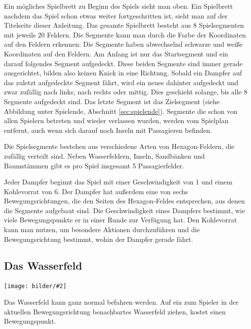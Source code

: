 \documentclass[12pt,a4paper, ngerman, oneside]{scrartcl}
\def\Tiles/{8}
\def\FieldsPerTile/{20}
\def\Passagiere/{5}
\newcommand{\fieldGraphic}[2]{%
\begin{floatingfigure}[#1]{0.15\textwidth}%
  \centering
  \texttt{[image: bilder/\#2]}%
\end{floatingfigure}%
}
\begin{document}
Ein mögliches Spielbrett zu Beginn des Spiels sieht man oben. Ein Spielbrett
nachdem das Spiel schon etwas weiter fortgeschritten ist, sieht man auf der
Titelseite dieser Anleitung. Das gesamte Spielbrett besteht aus \Tiles/
Spielsegmenten mit jeweils \FieldsPerTile/ Feldern. Die Segmente kann man durch
die Farbe der Koordinaten auf den Feldern erkennen: Die Segmente haben
abwechselnd schwarze und weiße Koordinaten auf den Feldern. Am Anfang ist nur
das Startsegment und ein darauf folgendes Segment aufgedeckt. Diese beiden
Segmente sind immer gerade ausgerichtet, bilden also keinen Knick in eine
Richtung. Sobald ein Dampfer auf das zuletzt aufgedeckte Segment fährt, wird ein
neues dahinter aufgedeckt und zwar zufällig nach links, nach rechts oder mittig.
Dies geschieht solange, bis alle \Tiles/ Segmente aufgedeckt sind. Das letzte
Segment ist das Zielsegment (siehe Abbildung unter Spielende, Abschnitt
\ref{sec:spielende}). Segmente die schon von allen Spielern betreten und wieder
verlassen wurden, werden vom Spielplan entfernt, auch wenn sich darauf noch
Inseln mit Passagieren befinden.

Die Spielsegmente bestehen aus verschiedene Arten von Hexagon-Feldern, die
zufällig verteilt sind. Neben Wasserfeldern, Inseln, Sandbänken und Baumstämmen
gibt es pro Spiel insgesamt \Passagiere/ Passagierfelder.

Jeder Dampfer beginnt das Spiel mit einer Geschwindigkeit von 1 und einem
Kohlevorrat von 6. Der Dampfer hat außerdem eine von sechs Bewegungsrichtungen,
die den Seiten des Hexagon-Feldes entsprechen, aus denen die Segmente aufgebaut
sind. Die Geschwindigkeit eines Dampfers bestimmt, wie viele Bewegungspunkte er
in einer Runde zur Verfügung hat. Den Kohlevorrat kann man nutzen, um besondere
Aktionen durchzuführen und die Bewegungsrichtung bestimmt, wohin der Dampfer
gerade fährt.

\subsection{\label{water}Das Wasserfeld}

\fieldGraphic{r}{wasser}

Das Wasserfeld kann ganz normal befahren werden. Auf ein zum Spieler in der
aktuellen Bewegungsrichtung benachbartes Wasserfeld ziehen, kostet einen
Bewegungspunkt.

\paragraph{}
\end{document}
